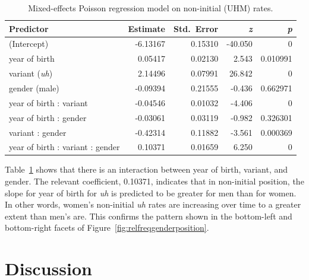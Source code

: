 \documentclass[11pt]{article}
\begin{document}
\begin{table}
    \centering
    \begin{tabular}{lrrrr}
        \toprule
        Predictor                        & Estimate & Std.~Error & \emph{z} & \emph{p} \\
        \midrule
        (Intercept)                      & -6.13167 & 0.15310    & -40.050  & 0        \\
        year of birth                    & 0.05417  & 0.02130    & 2.543    & 0.010991 \\
        variant (\emph{uh})              & 2.14496  & 0.07991    & 26.842   & 0        \\
        gender (male)                    & -0.09394 & 0.21555    & -0.436   & 0.662971 \\
        year of birth : variant          & -0.04546 & 0.01032    & -4.406   & 0        \\
        year of birth : gender           & -0.03061 & 0.03119    & -0.982   & 0.326301 \\
        variant : gender                 & -0.42314 & 0.11882    & -3.561   & 0.000369 \\
        year of birth : variant : gender & 0.10371  & 0.01659    & 6.250    & 0        \\
        \bottomrule
    \end{tabular}
    \caption{Mixed-effects Poisson regression model on non-initial (UHM) rates.}\label{tab:poisson}
\end{table}

Table~\ref{tab:poisson} shows that there is an interaction between year of birth,
variant, and gender.
The relevant coefficient, 0.10371, indicates that in non-initial position, the
slope for year of birth for \emph{uh} is predicted to be greater for men than
for women.
In other words, women's non-initial \emph{uh} rates are increasing over time to
a greater extent than men's are.
This confirms the pattern shown in the bottom-left and bottom-right facets of
Figure~\ref{fig:relfreqgenderposition}.

\section{Discussion}
\end{document}
